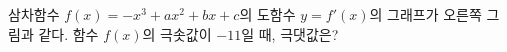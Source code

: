 \noindent\begin{minipage}[t]{0.58\linewidth}\vspace{0pt}\raggedright 삼차함수 $f(x)=-x^3+ax^2+bx+c$의 도함수 $y=f'(x)$의 그래프가 오른쪽 그림과 같다. 함수 $f(x)$의 극솟값이 $-11$일 때, 극댓값은? \end{minipage}\hfill\begin{minipage}[t]{0.4\linewidth}\vspace{0pt}\centering \resizebox{\ifdim\width>\linewidth\linewidth\else\width\fi}{!}{}\end{minipage}\par
{}
